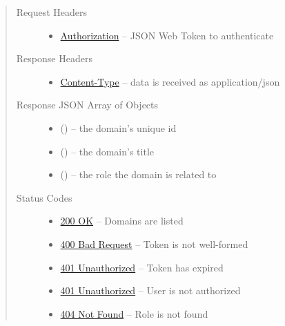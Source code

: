 \documentclass[letterpaper,10pt,english]{sphinxmanual}
\begin{document}
\begin{fulllineitems}
\begin{quote}
\begin{description}
\begin{itemize}
\end{itemize}

\item[{Request Headers}] \leavevmode\begin{itemize}
\item {} 
\href{http://tools.ietf.org/html/rfc7235\#section-4.2}{Authorization} -- JSON Web Token to authenticate

\end{itemize}

\item[{Response Headers}] \leavevmode\begin{itemize}
\item {} 
\href{http://tools.ietf.org/html/rfc7231\#section-3.1.1.5}{Content-Type} -- data is received as application/json

\end{itemize}

\item[{Response JSON Array of Objects}] \leavevmode\begin{itemize}
\item {} 
 () -- the domain's unique id

\item {} 
 () -- the domain's title

\item {} 
 () -- the role the domain is related to

\end{itemize}

\item[{Status Codes}] \leavevmode\begin{itemize}
\item {} 
\href{http://www.w3.org/Protocols/rfc2616/rfc2616-sec10.html\#sec10.2.1}{200 OK} -- Domains are listed

\item {} 
\href{http://www.w3.org/Protocols/rfc2616/rfc2616-sec10.html\#sec10.4.1}{400 Bad Request} -- Token is not well-formed

\item {} 
\href{http://www.w3.org/Protocols/rfc2616/rfc2616-sec10.html\#sec10.4.2}{401 Unauthorized} -- Token has expired

\item {} 
\href{http://www.w3.org/Protocols/rfc2616/rfc2616-sec10.html\#sec10.4.2}{401 Unauthorized} -- User is not authorized

\item {} 
\href{http://www.w3.org/Protocols/rfc2616/rfc2616-sec10.html\#sec10.4.5}{404 Not Found} -- Role is not found

\end{itemize}

\end{description}\end{quote}

\end{fulllineitems}
\end{document}

